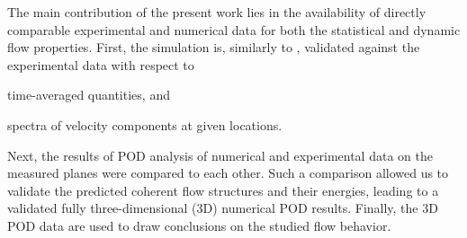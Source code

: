 The main contribution of the present work lies in {the} availability of directly comparable experimental and numerical data for both the statistical and dynamic flow properties. First, the simulation is, similarly to \citep{jie2016,gonzalez2019}, validated against the experimental data with respect to
\begin{inparaenum}[(i)]
        \item time-averaged quantities, and
        \item spectra of velocity components at given locations.
\end{inparaenum}
Next, the results of POD analysis of numerical and experimental data on the measured planes were compared to each other. Such a comparison allowed us to validate the predicted coherent flow structures and their energies, leading to {a} validated fully three-dimensional (3D) numerical POD results. Finally, the 3D POD data are used to draw conclusions on the studied flow behavior.

